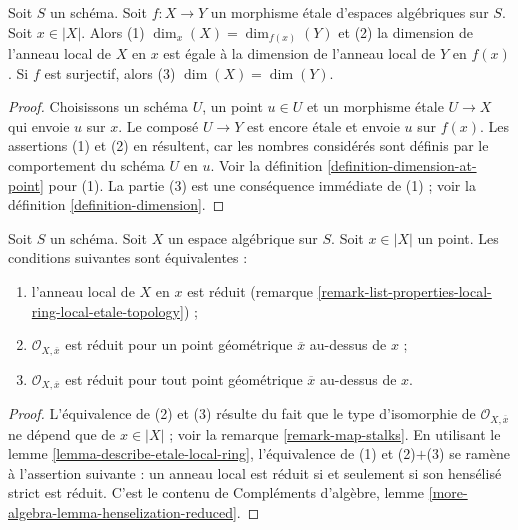 \begin{lemma}
\label{lemma-dimension-decent-invariant-under-etale}
Soit $S$ un schéma. Soit $f : X \to Y$ un morphisme \'etale
d'espaces algébriques sur $S$. Soit $x \in |X|$. Alors
(1) $\dim_x(X) = \dim_{f(x)}(Y)$ et (2) la dimension de
l'anneau local de $X$ en $x$ est égale à la dimension de
l'anneau local de $Y$ en $f(x)$. Si $f$ est surjectif, alors
(3) $\dim(X) = \dim(Y)$.
\end{lemma}

\begin{proof}
Choisissons un schéma $U$, un point $u \in U$ et un morphisme \'etale
$U \to X$ qui envoie $u$ sur $x$. Le composé $U \to Y$
est encore \'etale et envoie $u$ sur $f(x)$. Les assertions (1) et (2)
en résultent, car les nombres considérés sont définis par le comportement
du schéma $U$ en $u$. Voir la
définition \ref{definition-dimension-at-point} pour (1). La partie (3) est
une conséquence immédiate de (1) ; voir la définition \ref{definition-dimension}.
\end{proof}

\begin{lemma}
\label{lemma-reduced-local-ring}
Soit $S$ un schéma. Soit $X$ un espace algébrique sur $S$.
Soit $x \in |X|$ un point. Les conditions suivantes sont équivalentes :
\begin{enumerate}
\item l'anneau local de $X$ en $x$ est réduit
(remarque \ref{remark-list-properties-local-ring-local-etale-topology}) ;
\item $\mathcal{O}_{X, \overline{x}}$ est réduit pour un point
géométrique $\overline{x}$ au-dessus de $x$ ;
\item $\mathcal{O}_{X, \overline{x}}$ est réduit pour tout point
géométrique $\overline{x}$ au-dessus de $x$.
\end{enumerate}
\end{lemma}

\begin{proof}
L'équivalence de (2) et (3) résulte du fait que le
type d'isomorphie de $\mathcal{O}_{X, \overline{x}}$ ne dépend que
de $x \in |X|$ ; voir la remarque \ref{remark-map-stalks}.
En utilisant le lemme \ref{lemma-describe-etale-local-ring},
l'équivalence de (1) et (2)$+$(3) se ramène à
l'assertion suivante : un anneau local est réduit si et seulement si
son hensélisé strict est réduit. C'est le contenu de
Compléments d'algèbre, lemme \ref{more-algebra-lemma-henselization-reduced}.
\end{proof}











